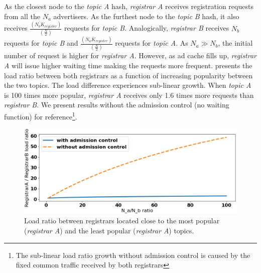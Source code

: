 As the closest node to the \emph{topic A} hash, \emph{registrar A} receives registration requests from all the $N_a$ advertisers. As the furthest node to the \emph{topic B} hash, it also receives $\frac{(N_{b}K_\textit{register})}{(\frac{N}{2})}$ requests for \emph{topic B}. Analogically, \emph{registrar B} receives $N_b$ requests for \emph{topic B} and $\frac{(N_{a}K_\textit{register})}{(\frac{N}{2})}$ requests for \emph{topic A}. As $N_a \gg N_b$, the initial number of request is higher for \emph{registrar A}. However, as ad cache fills up, \emph{registrar A} will issue higher waiting time making the requests more frequent.  presents the load ratio between both registrars as a function of increasing popularity between the two topics. The load difference experiences sub-linear growth. When \emph{topic A} is 100 times more popular, \emph{registrar A} receives only 1.6 times more requests than \emph{registrar B}. We present results without the admission control (\ie no waiting function) for reference\footnote{The sub-linear load ratio growth without admission control is caused by the fixed common traffic received by both registrars}. 

\begin{figure}[t]
    \includegraphics[width=1\linewidth]{img/fairness_registration}
    \caption{Load ratio between registrars located close to the most popular (\emph{registrar A}) and the least popular (\emph{registrar A}) topics.
    }
    \label{fig:fairness_registration}
\end{figure}


